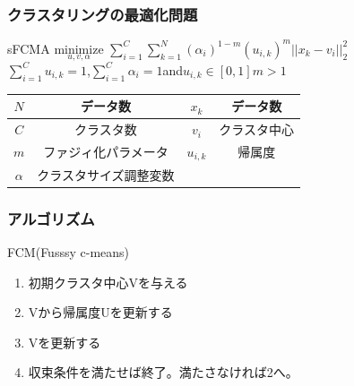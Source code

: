 \documentclass[13pt,dvipdfmx]{beamer}
\begin{document}
\begin{frame}\frametitle{クラスタリングの最適化問題}
  \begin{block}{sFCMA}
    \quad$\underset{u,v,\alpha}{\text{minimize}}$
    $\sum_{i=1}^C\sum_{k=1}^N(\alpha_{i})^{1-m}(u_{i,k})^m||x_k-v_i||_2^2$\\
    $\sum_{i=1}^Cu_{i,k}=1$\;,\;$\sum_{i=1}^C\alpha_{i}=1$\;and\;$u_{i,k}\in[0,1]$\quad$m>1$
  \end{block}
  \begin{center}
\begin{tabular}{c||c|c||c} \hline
	{$N$}&データ数&{$x_k$}&データ数 \\ \hline
	{$C$}&クラスタ数&{$v_i$}&クラスタ中心\\ \hline
	{$m$}&ファジィ化パラメータ&{$u_{i,k}$}&帰属度 \\ \hline
	{$\alpha$}&クラスタサイズ調整変数\\ \hline
\end{tabular}
\end{center}
\end{frame}

\begin{frame}\frametitle{アルゴリズム}
\begin{block}{FCM(Fusssy c-means)}
\begin{enumerate}
 \item 初期クラスタ中心Vを与える
 \item Vから帰属度Uを更新する
 \item Vを更新する
 \item 収束条件を満たせば終了。満たさなければ2へ。
\end{enumerate}
\end{block}
\end{frame}
\end{document}
